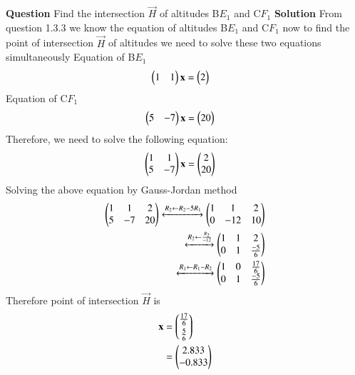 \documentclass[journal,12pt,twocolumn]{IEEEtran}
\theoremstyle{remark}
\begin{document}
%
\textbf{Question}\newline
Find the intersection $\vec{H}$ of altitudes B$E_{1}$ and C$F_{1}$\newline
%
\indent\textbf{Solution}\newline
From question 1.3.3 we know the equation of altitudes B$E_{1}$ and C$F_{1}$ now to find the point of intersection $\vec{H}$ of altitudes we need to solve these two equations simultaneously\newline
%
Equation of B$E_{1}$
\begin{align}
        \begin{pmatrix}1&1\end{pmatrix} \mathbf{x} &= \begin{pmatrix}2\end{pmatrix}
\end{align}
%
Equation of C$F_{1}$
\begin{align}
        \begin{pmatrix}5&-7\end{pmatrix} \mathbf{x} &= \begin{pmatrix}20\end{pmatrix}
\end{align}
%
Therefore, we need to solve the following equation:
%
\begin{align}
        \begin{pmatrix}1&1\\5&-7\end{pmatrix} \mathbf{x} &= \begin{pmatrix}2\\20\end{pmatrix}
\end{align}
%
Solving the above equation by Gauss-Jordan method
%
\begin{align}
        \begin{pmatrix}1&1&2\\5&-7&20\end{pmatrix}
	 \xleftrightarrow[]{R_2 \leftarrow R_2 - 5R_1}
        \begin{pmatrix}1&1&2\\0&-12&10\end{pmatrix}\\
	 \xleftrightarrow[]{R_2 \leftarrow \frac{R_2}{-12}}
        \begin{pmatrix}1&1&2\\0&1&\frac{-5}{6}\end{pmatrix}\\
	 \xleftrightarrow[]{R_1 \leftarrow R_1 - R_2}
        \begin{pmatrix}1&0&\frac{17}{6}\\0&1&\frac{-5}{6}\end{pmatrix}
\end{align}
%
	Therefore point of intersection $\vec{H}$ is
%
\begin{align}
        \vec{x}&=\myvec{\frac{17}{6}\vspace{0.1cm}\\\frac{5}{6}}\\
               &=\myvec{2.833\\-0.833}
\end{align}
\end{document}
